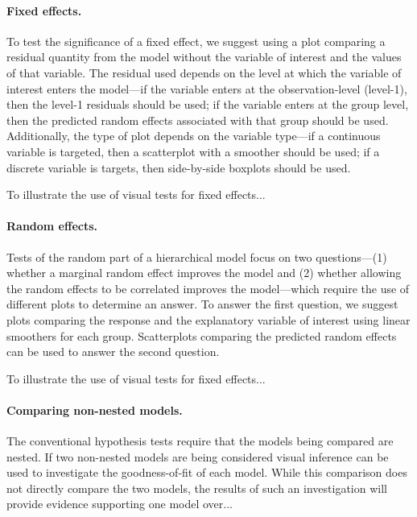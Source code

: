 \documentclass{article} %
\begin{document}
\paragraph{Fixed effects.} To test the significance of a fixed effect, we suggest using a plot comparing a residual quantity from the model without the variable of interest and the values of that variable. The residual used depends on the level at which the variable of interest enters the model---if the variable enters at the observation-level (level-1), then the level-1 residuals should be used; if the variable enters at the group level, then the predicted random effects associated with that group should be used. Additionally, the type of plot depends on the variable type---if a continuous variable is targeted, then a scatterplot with a smoother should be used; if a discrete variable is targets, then side-by-side boxplots should be used.

To illustrate the use of visual tests for fixed effects...


\paragraph{Random effects.} Tests of the random part of a hierarchical model focus on two questions---(1) whether a marginal random effect improves the model and (2) whether allowing the random effects to be correlated improves the model---which require the use of different plots to determine an answer. To answer the first question, we suggest plots comparing the response and the explanatory variable of interest using linear smoothers for each group. Scatterplots comparing the predicted random effects can be used to answer the second question.

To illustrate the use of visual tests for fixed effects...

\paragraph{Comparing non-nested models.}
The conventional hypothesis tests require that the models being compared are nested. If two non-nested models are being considered visual inference can be used to investigate the goodness-of-fit of each model. While this comparison does not directly compare the two models, the results of such an investigation will provide evidence supporting one model over...
\end{document}
